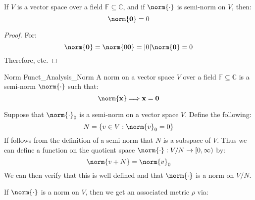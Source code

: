             \begin{theorem}
                If $V$ is a vector space over a field
                $\mathbb{F}\subseteq\mathbb{C}$, and if
                $\norm{\cdot}$ is semi-norm on $V$, then:
                \begin{equation}
                    \norm{\mathbf{0}}=0
                \end{equation}
            \end{theorem}
            \begin{proof}
                For:
                \begin{equation}
                    \norm{\mathbf{0}}
                    =\norm{0\mathbf{0}}
                    =|0|\norm{\mathbf{0}}=0
                \end{equation}
                Therefore, etc.
            \end{proof}
            \begin{ldefinition}{Norm}
                  {Funct_Analysis_Norm}
                A norm on a vector space $V$ over a
                field $\mathbb{F}\subseteq\mathbb{C}$
                is a semi-norm $\norm{\cdot}$ such that:
                \begin{equation}
                    \norm{\mathbf{x}}\Longrightarrow\mathbf{x}
                    =\mathbf{0}
                \end{equation}
            \end{ldefinition}
            \begin{lexample}
                Suppose that $\norm{\cdot}_{0}$ is a semi-norm
                on a vector space $V$. Define the following:
                \begin{equation}
                    N=\{v\in{V}:\norm{v}_{0}=0\}
                \end{equation}
                If follows from the definition of a semi-norm that
                $N$ is a subspace of $V$. Thus we can define a
                function on the quotient space
                $\norm{\cdot}:V/N\rightarrow[0,\infty)$ by:
                \begin{equation}
                    \norm{v+N}=\norm{v}_{0}
                \end{equation}
                We can then verify that this is well defined and
                that $\norm{\cdot}$ is a norm on $V/N$.
            \end{lexample}
            If $\norm{\cdot}$ is a norm on $V$, then we get an
            associated metric $\rho$ via:
